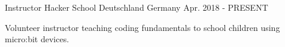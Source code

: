 

\begin{cventries}

\cventry
{Instructor} %
{Hacker School Deutschland} %
{Germany} %
{Apr. 2018 - PRESENT} %
{
  \begin{cvitems} %
    \item {Volunteer instructor teaching coding fundamentals to school children using micro:bit devices.}
  \end{cvitems}
}

\end{cventries}
